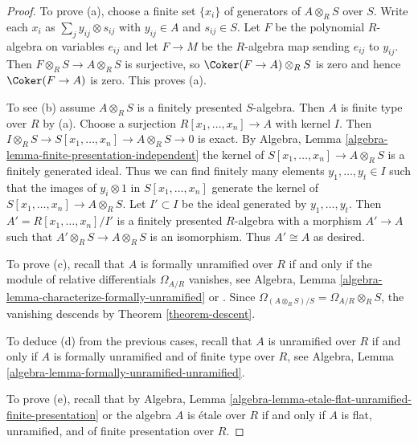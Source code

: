 \begin{proof}
To prove (a), choose a finite set $\{x_i\}$ of generators of $A \otimes_R S$
over $S$. Write each $x_i$ as $\sum_j y_{ij} \otimes s_{ij}$ with
$y_{ij} \in A$ and $s_{ij} \in S$. Let $F$ be the polynomial $R$-algebra
on variables $e_{ij}$ and let $F \to M$ be the $R$-algebra map sending
$e_{ij}$ to $y_{ij}$. Then $F \otimes_R S\to A \otimes_R S$ is surjective, so
$\Coker(F \to A) \otimes_R S$ is zero and hence $\Coker(F \to A)$
is zero. This proves (a).

\medskip\noindent
To see (b) assume $A \otimes_R S$ is a finitely presented $S$-algebra.
Then $A$ is finite type over $R$ by (a). Choose a surjection
$R[x_1, \ldots, x_n] \to A$ with kernel $I$.
Then $I \otimes_R S \to S[x_1, \ldots, x_n] \to A \otimes_R S \to 0$ is exact.
By Algebra, Lemma \ref{algebra-lemma-finite-presentation-independent}
the kernel of $S[x_1, \ldots, x_n] \to A \otimes_R S$
is a finitely generated ideal. Thus we can find finitely many elements
$y_1, \ldots, y_t \in I$ such that the images of $y_i \otimes 1$ in
$S[x_1, \ldots, x_n]$ generate the kernel of
$S[x_1, \ldots, x_n] \to A \otimes_R S$.
Let $I' \subset I$ be the ideal generated by $y_1, \ldots, y_t$.
Then $A' = R[x_1, \ldots, x_n]/I'$ is a finitely presented $R$-algebra
with a morphism $A' \to A$ such that $A' \otimes_R S \to A \otimes_R S$
is an isomorphism. Thus $A' \cong A$ as desired.

\medskip\noindent
To prove (c), recall that $A$ is formally unramified over $R$ if and only
if the module of relative differentials $\Omega_{A/R}$ vanishes, see
Algebra, Lemma \ref{algebra-lemma-characterize-formally-unramified} or
\cite[Proposition~17.2.1]{EGA4}.
Since $\Omega_{(A \otimes_R S)/S} = \Omega_{A/R} \otimes_R S$,
the vanishing descends by Theorem \ref{theorem-descent}.

\medskip\noindent
To deduce (d) from the previous cases, recall that $A$ is unramified
over $R$ if and only if $A$ is formally unramified and of finite type
over $R$, see
Algebra, Lemma \ref{algebra-lemma-formally-unramified-unramified}.

\medskip\noindent
To prove (e), recall that by
Algebra, Lemma \ref{algebra-lemma-etale-flat-unramified-finite-presentation}
or \cite[Th\'eor\`eme~17.6.1]{EGA4} the algebra
$A$ is \'etale over $R$ if and only if
$A$ is flat, unramified, and of finite presentation over $R$.
\end{proof}

